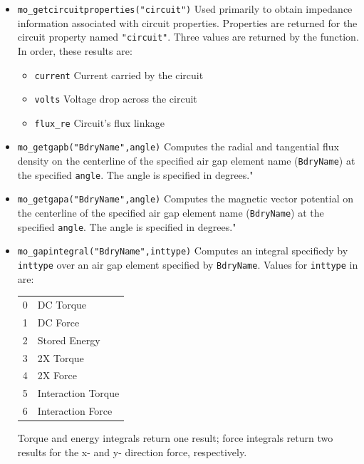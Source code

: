 \begin{itemize}
\item{\verb+mo_getcircuitproperties("circuit")+}
Used primarily to obtain impedance information associated with
circuit properties.  Properties are returned for the circuit
property named {\tt "circuit"}. Three values are returned by the
function.  In order, these results are:
\begin{itemize}
        \item{\verb+current+} Current carried by the circuit
        \item{\verb+volts+}  Voltage drop across the circuit
        \item{\verb+flux_re+} Circuit's flux linkage
        \end{itemize}




\item{\verb+mo_getgapb("BdryName",angle)+}
Computes the radial and tangential flux density on the centerline of the
specified air gap element name (\verb+BdryName+) at the specified \verb+angle+.  The angle is specified in degrees."

\item{\verb+mo_getgapa("BdryName",angle)+}
Computes the magnetic vector potential on the centerline of the
specified air gap element name (\verb+BdryName+) at the specified \verb+angle+.  The angle is specified in degrees."

\item{\verb+mo_gapintegral("BdryName",inttype)+}
Computes an integral specifiedy by \verb+inttype+ over an air gap element specified
by \verb+BdryName+. Values for {\tt inttype} in are:
\begin{center}
\begin{tabular}{ll} \hline
0  & DC Torque\\
1  & DC Force\\
2  & Stored Energy\\
3  & 2X Torque\\
4  & 2X Force\\
5  & Interaction Torque\\
6  & Interaction Force\\
\hline
\end{tabular}
\end{center}
Torque and energy integrals return one result; force integrals return two results for the x- and y- direction force, respectively.


\end{itemize}
